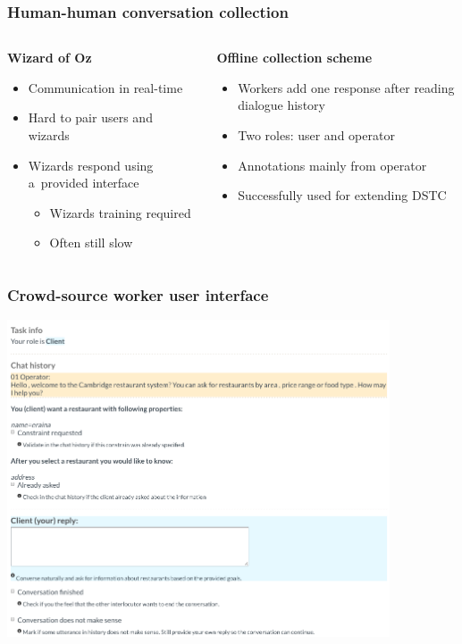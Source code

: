 \documentclass[10pt, compress,british,xcolor={svgnames,dvipsnames,x11names},trans]{beamer}
\begin{document}
\begin{frame}\frametitle{Human-human conversation collection}
\begin{columns}
\begin{column}{0.45\textwidth}
    {\bf Wizard of Oz} \\
    \begin{itemize}
        \item Communication in real-time 
        \item Hard to pair users and wizards
        \item Wizards respond using a~provided interface
            \begin{itemize}
                \item Wizards training required 
                \item Often still slow  
            \end{itemize}
    \end{itemize}
\end{column}
\begin{column}{0.45\textwidth}
    {\bf Offline collection scheme}
    \begin{itemize}
        \item Workers add one response after reading dialogue history  
        \item Two roles: user and operator 
        \item Annotations mainly from operator
        \item Successfully used for extending DSTC~\cite{wen_networkbased_2016}
    \end{itemize}
\end{column}
\end{columns}
\end{frame}

\begin{frame}\frametitle{Crowd-source worker user interface}
    \begin{center}
    \includegraphics[width=0.85\textwidth]{./gui-annotators-client.png}
    \end{center}
\end{frame}
\end{document}

